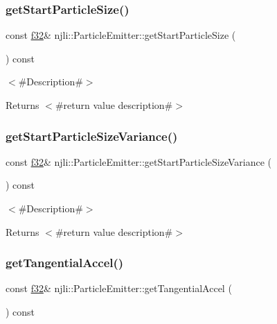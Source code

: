 \subsubsection{\texorpdfstring{get\+Start\+Particle\+Size()}{getStartParticleSize()}}
{\footnotesize\ttfamily const \mbox{\hyperlink{_util_8h_a5f6906312a689f27d70e9d086649d3fd}{f32}}\& njli\+::\+Particle\+Emitter\+::get\+Start\+Particle\+Size (\begin{DoxyParamCaption}{ }\end{DoxyParamCaption}) const}

$<$\#\+Description\#$>$

\begin{DoxyReturn}{Returns}
$<$\#return value description\#$>$ 
\end{DoxyReturn}
\mbox{\label{classnjli_1_1_particle_emitter_a701918fb2f09961be26f707007aac7dd}} 
\subsubsection{\texorpdfstring{get\+Start\+Particle\+Size\+Variance()}{getStartParticleSizeVariance()}}
{\footnotesize\ttfamily const \mbox{\hyperlink{_util_8h_a5f6906312a689f27d70e9d086649d3fd}{f32}}\& njli\+::\+Particle\+Emitter\+::get\+Start\+Particle\+Size\+Variance (\begin{DoxyParamCaption}{ }\end{DoxyParamCaption}) const}

$<$\#\+Description\#$>$

\begin{DoxyReturn}{Returns}
$<$\#return value description\#$>$ 
\end{DoxyReturn}
\mbox{\label{classnjli_1_1_particle_emitter_ab03a9c460bed389cd99131a0700db5af}} 
\subsubsection{\texorpdfstring{get\+Tangential\+Accel()}{getTangentialAccel()}}
{\footnotesize\ttfamily const \mbox{\hyperlink{_util_8h_a5f6906312a689f27d70e9d086649d3fd}{f32}}\& njli\+::\+Particle\+Emitter\+::get\+Tangential\+Accel (\begin{DoxyParamCaption}{ }\end{DoxyParamCaption}) const}

